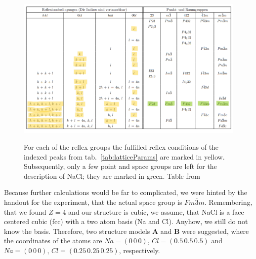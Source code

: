 \begin{figure}[ht]
    \centering
    \includegraphics[angle = 90, width = 0.8 \linewidth]{Bilder/Auswertung/NaCl/table extinktion marked.png}
    \label{fig:reflexCond}
    \caption{For each of the reflex groups the fulfilled reflex conditions of the indexed peaks from tab.~\ref{tab:latticeParams} are marked in yellow. Subsequently, only a few point and space groups are left for the description of NaCl; they are marked in green. Table from~\cite{Aroyo2016}}
\end{figure}

Because further calculations would be far to complicated, we were hinted by the handout for the experiment, that the actual space group is $Fm\overline{3}m$. Remembering, that we found $Z=4$ and our structure is cubic, we assume, that NaCl is a face centered cubic (fcc) with a two atom basis (Na and Cl). Anyhow, we still do not know the basis. Therefore, two structure models $\mathbf{A}$ and $\mathbf{B}$ were suggested, where the coordinates of the atoms are $Na = (0\,0\,0)$, $Cl = (0.5\,0.5\,0.5)$ and $Na = (0\,0\,0)$, $Cl = (0.25\,0.25\,0.25)$, respectively. 